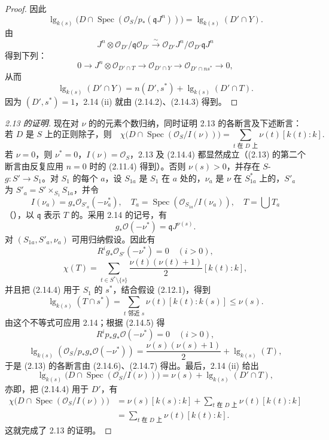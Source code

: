 \begin{proof}
因此
\[
\operatorname{lg}_{k(s)}\bigl(D\cap\operatorname{Spec}(\mathcal O_S/p_*(\mathfrak qJ^n))\bigr)
=\operatorname{lg}_{k(s)}(D'\cap Y).\tag{2.14.2}
\]
由
\[
J^n\otimes\mathcal O_{D'}/\mathfrak q\mathcal O_{D'}
\xrightarrow{\sim}\mathcal O_{D'}J^n/\mathcal O_{D'}\mathfrak qJ^n
\]
得到下列：
\[
0\longrightarrow J^n\otimes\mathcal O_{D'\cap T}
\longrightarrow\mathcal O_{D'\cap Y}\longrightarrow\mathcal O_{D'\cap ns^*}\longrightarrow0,
\]
从而
\[
\operatorname{lg}_{k(s)}(D'\cap Y)
=n(D',s^*)+\operatorname{lg}_{k(s)}(D'\cap T).\tag{2.14.3}
\]
因为 $(D',s^*)=1$，2.14 (ii) 就由 (2.14.2)、(2.14.3) 得到。
\end{proof}

\begin{proof}[ 2.13 的证明]
现在对 $\nu$ 的的元素个数归纳，同时证明 2.13 的各断言及下述断言：
\[
\text{若 $D$ 是 $S$ 上的正则除子，则}\quad
\chi\bigl(D\cap\operatorname{Spec}(\mathcal O_S/I(\nu))\bigr)
=\sum_{t\text{ 在 }D\text{ 上}}\nu(t)[k(t):k].\tag{2.14.4}
\]
若 $\nu=0$，则 $\nu^*=0$，$I(\nu)=\mathcal O_S$，2.13 及 (2.14.4) 都显然成立（(2.13) 的第二个断言由反复应用 $n=0$ 时的 (2.11.4) 得到）。否则 $\nu(s)>0$，并存在 $S$- $g:S'\to S_1$。对 $S_1$ 的每个 $a$，设 $S_{1a}$ 是 $S_1$ 在 $a$ 处的，$\nu_a$ 是 $\nu$ 在 $S_{1a}^*$ 上的，$S'_a$ 为 $S'_a=S'\times_{S_1}S_{1a}$，并令
\[
I(\nu_a)=g_*\mathcal O_{S'_a}(-\nu_a^*),\quad
T_a=\operatorname{Spec}(\mathcal O_{S_{1a}}/I(\nu_a)),\quad T=\bigcup T_a
\]
（），以 $\mathfrak q$ 表示 $T$ 的。采用 2.14 的记号，有
\[
g_*\mathcal O(-\nu^*)=\mathfrak qJ^{\nu(s)}.\tag{2.14.5}
\]
对 $(S_{1a},S'_a,\nu_a)$ 可用归纳假设。因此有
\[
R^ig_*\mathcal O_{S'}(-\nu^*)=0\quad(i>0),\tag{2.14.6}
\]
\[
\chi(T)=\sum_{t\in S^*\setminus\{s\}}
\frac{\nu(t)(\nu(t)+1)}2[k(t):k],\tag{2.14.7}
\]
并且把 (2.14.4) 用于 $S_1$ 的 $s^*$，结合假设 (2.12.1)，得到
\[
\operatorname{lg}_{k(s)}(T\cap s^*)
=\sum_{t\text{ 邻近 }s}\nu(t)[k(t):k(s)]\leq\nu(s).
\]
由这个不等式可应用 2.14；根据 (2.14.5) 得
\[
R^ip_*g_*\mathcal O(-\nu^*)=0\quad(i>0),
\]
\[
\operatorname{lg}_{k(s)}(\mathcal O_S/p_*g_*\mathcal O(-\nu^*))
=\frac{\nu(s)(\nu(s)+1)}2+\operatorname{lg}_{k(s)}(T),
\]
于是 (2.13) 的各断言由 (2.14.6)、(2.14.7) 得出。最后，2.14 (ii) 给出
\[
\operatorname{lg}_{k(s)}\bigl(D\cap\operatorname{Spec}(\mathcal O_S/I(\nu))\bigr)
=\nu(s)+\operatorname{lg}_{k(s)}(D'\cap T),
\]
亦即，把 (2.14.4) 用于 $D'$，有
\begin{align*}
\chi\bigl(D\cap\operatorname{Spec}(\mathcal O_S/I(\nu))\bigr)
&=\nu(s)[k(s):k]+\sum_{t\text{ 在 }D\text{ 上}}\nu(t)[k(t):k]\\
&=\sum_{t\text{ 在 }D\text{ 上}}\nu(t)[k(t):k].
\end{align*}
这就完成了 2.13 的证明。
\end{proof}

